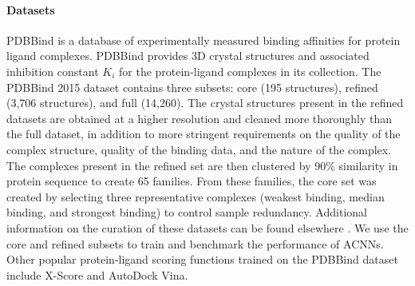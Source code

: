 \paragraph{Datasets}
PDBBind \cite{wang2004pdbbind,wang2005pdbbind} is a database of experimentally measured binding affinities for protein ligand complexes. PDBBind provides 3D crystal structures and associated inhibition constant $K_i$ for the protein-ligand complexes in its collection. The PDBBind 2015 dataset contains three subsets: core (195 structures), refined (3,706 structures), and full (14,260). The crystal structures present in the refined datasets are obtained at a higher resolution and cleaned more thoroughly than the full dataset, in addition to more stringent requirements on the quality of the complex structure, quality of the binding data, and the nature of the complex. The complexes present in the refined set are then clustered by 90\% similarity in protein sequence to create 65 families.  From these families, the core set was created by selecting three representative complexes (weakest binding, median binding, and strongest binding) to control sample redundancy.  Additional information on the curation of these datasets can be found elsewhere \cite{liu2014pdb}.  We use the core and refined subsets to train and benchmark the performance of ACNNs.  Other popular protein-ligand scoring functions trained on the PDBBind dataset include X-Score\cite{wang2002further} and AutoDock Vina\cite{trott2010autodock}.

